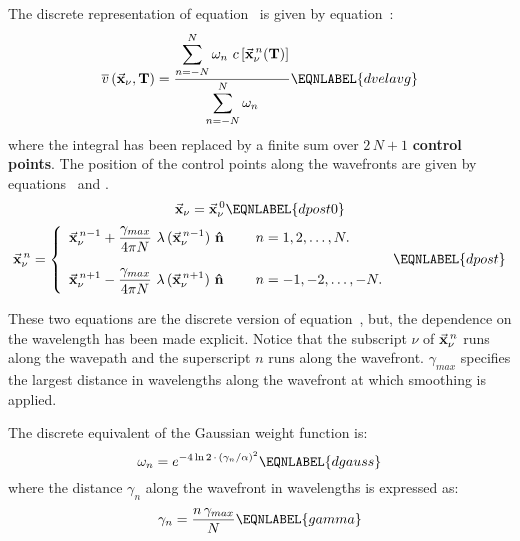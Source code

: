 The discrete representation of equation~ is given
by equation~:
%
\begin{equation}
 \overline{v}\, (\vec{\bf x}_{\nu},{\bf T\/}) = \frac{
 \displaystyle \sum_{n=-N}^{N}
 \omega_{n}\ c\, [\vec{\bf x}_{\nu}^{\, n}({\bf T\/})] }
 {\displaystyle \sum_{n=-N}^{N}
 \omega_{n}}
\EQNLABEL{dvelavg}
\end{equation}
%
where the integral has been replaced by a finite sum over $2\,N+1$
{\bf control points\/}. The position of the control points along the
wavefronts
are given by equations~ and .
%
\begin{equation}
 \vec{\bf x}_{\nu} = \vec{\bf x}_{\nu}^{\, 0}
\EQNLABEL{dpost0}
\end{equation}
%
\begin{equation}
\vec{\bf x}_{\nu}^{\, n} = \left\{ \begin{array}{lll}
        \displaystyle
        \vec{\bf x}_{\nu}^{\, n-1} + \frac{\gamma_{max}}
            {4\pi N}\ \lambda\, (\vec{\bf x}_{\nu}^{\, n-1})\ {\bf \hat{n}} &
        \; &
        n=1,2, \ldots, N. \\
        \, \, \,          \\
        \displaystyle
        \vec{\bf x}_{\nu}^{\, n+1} - \frac{\gamma_{max}}
            {4\pi N}\ \lambda\, (\vec{\bf x}_{\nu}^{\, n+1})\ {\bf \hat{n}} &
        \; &
        n=-1,-2, \ldots, -N. \end{array}
        \right.
\EQNLABEL{dpost}
\end{equation}

These two equations are the discrete version of equation~, but,
the dependence on the wavelength has been made explicit.
Notice that the subscript $\nu$ of \( \vec{\bf x}_{\nu}^{\, n} \) 
runs along the wavepath and the
superscript $n$ runs along the wavefront.
$\gamma_{max}$ specifies the largest distance in wavelengths along
the wavefront at which smoothing is applied. 

The discrete equivalent of the Gaussian weight function is:
%
\begin{equation}
 \omega_{n} = e^{-4 \ln 2\, \cdot\, (\gamma_{n}/\alpha)^{2}}
\EQNLABEL{dgauss}
\end{equation}
%
where the distance \( \gamma_{n} \) along the wavefront in wavelengths
is expressed as:
%
\begin{equation}
 \gamma_{n} = \frac{n\, \gamma_{max}}{N}
\EQNLABEL{gamma}
\end{equation}

